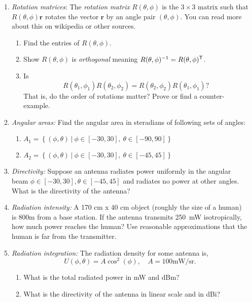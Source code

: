 \documentclass[11pt]{article}
\newcommand{\rbf}{\mathbf{r}}
\newcommand{\tran}{^{\text{\sf T}}}
\begin{document}
\begin{enumerate}
\item \emph{Rotation matrices}:  The \emph{rotation matrix}
$R(\theta,\phi)$ is the $3 \times 3$ matrix such that $R(\theta,\phi)\rbf$ rotates
the vector $\rbf$ by an angle pair $(\theta,\phi)$.  
You can read more about this on wikipedia or other sources.
\begin{enumerate}[label=(\alph*)]
  \item Find the entries of $R(\theta,\phi)$.
  \item Show $R(\theta,\phi)$ is \emph{orthogonal} meaning
  $R(\theta,\phi)^{-1}=R(\theta,\phi)\tran$.
  \item Is
\[
    R(\theta_1,\phi_1)R(\theta_2,\phi_2) = R(\theta_2,\phi_2)R(\theta_1,\phi_1)?
\]
That is, do the order of rotations matter?
Prove or find a counter-example.
\end{enumerate}


\item \emph{Angular areas:}  Find the angular area in steradians of
following sets of angles:
\begin{enumerate}[label=(\alph*)]
  \item $A_1 = \left\{ (\phi,\theta) ~ | ~ \phi \in [-30,30],~ \theta \in [-90,90]\right\}$
  \item $A_2 = \left\{ (\phi,\theta) ~|~ \phi \in [-30,30], ~ \theta \in [-45,45]\right\}$
\end{enumerate}

\item \emph{Directivity:}  Suppose an antenna radiates power uniformly in
the angular beam $\phi \in [-30,30], \theta \in [-45,45]$ and radiates
no power at other angles.  What is the directivity of the antenna?

\item \emph{Radiation intensity:}  A 170 cm x 40 cm object
(roughly the size of a human) is 800m from a base station.
If the antenna transmits 250~mW isotropically, how much power
reaches the human?  Use reasonable approximations that the human is far from the
transmitter.

\item \emph{Radiation integration:}  The radiation density for some antenna is,
\[
    U(\phi,\theta) = A\cos^2(\phi), \quad A = 100 \mbox{mW/sr}.
\]
\begin{enumerate}[label=(\alph*)]
\item What is the total radiated power in mW and dBm?
\item What is the directivity of the antenna in linear scale and in dBi?
\end{enumerate}


\end{enumerate}
\end{document}
